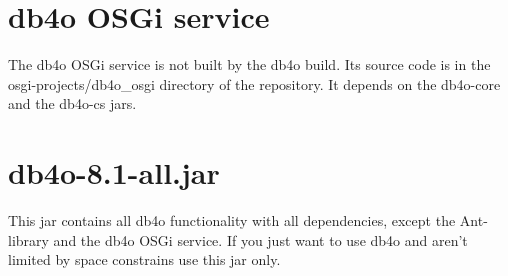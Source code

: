 \section*{db4o OSGi service}

The db4o OSGi service is not built by the db4o build. Its source code is in the osgi-projects/db4o\_osgi directory of the repository. It depends on the db4o-core and the db4o-cs jars.

\section*{db4o-8.1-all.jar}

This jar contains all db4o functionality with all dependencies, except the Ant-library and the db4o OSGi service. If you just want to use db4o and aren't limited by space constrains use this jar only.

